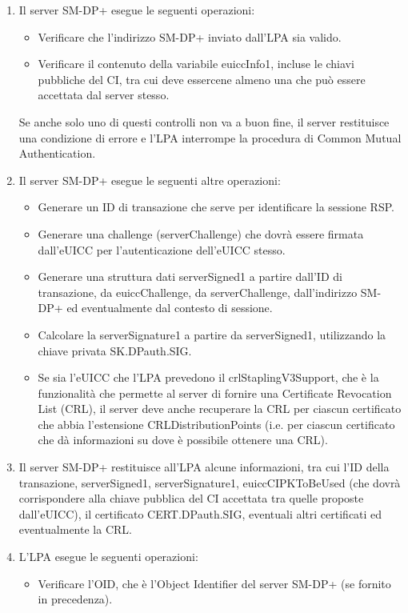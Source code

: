 \documentclass[10pt, oneside]{book}
\begin{document}
\begin{enumerate}
\item Il server SM-DP+ esegue le seguenti operazioni:
\begin{itemize}[itemsep=0pt]
\item Verificare che l'indirizzo SM-DP+ inviato dall'LPA sia valido.
\item Verificare il contenuto della variabile euiccInfo1, incluse le chiavi pubbliche del CI, tra cui deve essercene almeno una che può essere accettata dal server stesso.
\end{itemize}
Se anche solo uno di questi controlli non va a buon fine, il server restituisce una condizione di errore e l'LPA interrompe la procedura di Common Mutual Authentication.
\item Il server SM-DP+ esegue le seguenti altre operazioni:
\begin{itemize}[itemsep=0pt]
\item Generare un ID di transazione che serve per identificare la sessione RSP.
\item Generare una challenge (serverChallenge) che dovrà essere firmata dall'eUICC per l'autenticazione dell'eUICC stesso.
\item Generare una struttura dati serverSigned1 a partire dall'ID di transazione, da euiccChallenge, da serverChallenge, dall'indirizzo SM-DP+ ed eventualmente dal contesto di sessione.
\item Calcolare la serverSignature1 a partire da serverSigned1, utilizzando la chiave privata SK.DPauth.SIG.
\item Se sia l'eUICC che l'LPA prevedono il crlStaplingV3Support, che è la funzionalità che permette al server di fornire una Certificate Revocation List (CRL), il server deve anche recuperare la CRL per ciascun certificato che abbia l'estensione CRLDistributionPoints (i.e. per ciascun certificato che dà informazioni su dove è possibile ottenere una CRL).
\end{itemize}
\item Il server SM-DP+ restituisce all'LPA alcune informazioni, tra cui l'ID della transazione, serverSigned1, serverSignature1, euiccCIPKToBeUsed (che dovrà corrispondere alla chiave pubblica del CI accettata tra quelle proposte dall'eUICC), il certificato CERT.DPauth.SIG, eventuali altri certificati ed eventualmente la CRL.
\item L'LPA esegue le seguenti operazioni:
\begin{itemize}[itemsep=0pt]
\item Verificare l'OID, che è l'Object Identifier del server SM-DP+ (se fornito in precedenza).

\end{itemize}
\end{enumerate}
\end{document}
